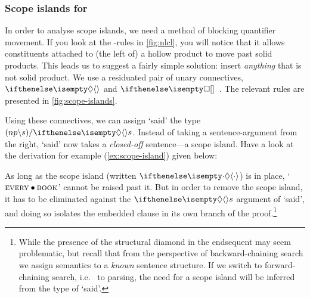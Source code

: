 \documentclass[10pt,a4paper]{llncs}
\begin{document}
\subsubsection*{Scope islands for \NLCL}
In order to analyse scope islands, we need a method of blocking
quantifier movement. If you look at the \I\B\C-rules in
\autoref{fig:nlcl}, you will notice that it allows constituents
attached to (the left of) a hollow product to move past solid
products.
This leads us to suggest a fairly simple solution: insert
\emph{anything} that is not solid product.
We use a residuated pair of unary connectives, $\di$ and
$\sq$~\citep{morrill1994,moortgat1996}.
The relevant rules are presented in \autoref{fig:scope-islands}.



\noindent
Using these connectives, we can assign `said' the type
$({np}\impr{s})\impl\di{s}$. Instead of taking a sentence-argument
from the right, `said' now takes a \emph{closed-off} sentence---a
scope island. Have a look at the derivation for example
(\ref{ex:scope-island}) given below:
\begin{scprooftree}
\end{scprooftree}
As long as the scope island (written $\di[\cdot]$) is in place,
`$\textsc{every}\prod\textsc{book}$' cannot be raised past it. But in
order to remove the scope island, it has to be eliminated against the
$\di{s}$ argument of `said', and doing so isolates the embedded clause
in its own branch of the proof.\footnote{%
  While the presence of the structural diamond in the endsequent may
  seem problematic, but recall that from the perspective of
  backward-chaining search we assign semantics to a \emph{known}
  sentence structure. If we switch to forward-chaining search, i.e.\ %
  to parsing, the need for a scope island will be inferred from the
  type of `said'.
}
\end{document}
